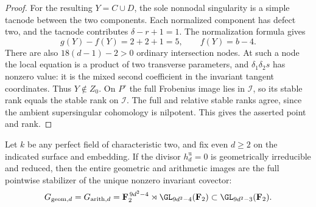 \begin{proof}
For the resulting $Y=C\cup D$, the sole nonnodal singularity
is a simple tacnode between the two components.
Each normalized component has defect two, and the tacnode
contributes $\delta-r+1=1$. The normalization formula gives
\[
                 g(Y)-f(Y)=2+2+1=5,
 \qquad f(Y)=b-4.
\]
There are also $18(d-1)-2>0$ ordinary intersection nodes.
At such a node the local equation is a product of two transverse
parameters, and $\delta_1\delta_2s$ has nonzero value: it is the
mixed second coefficient in the invariant tangent coordinates.
Thus $Y\notin Z_0$. On $P^\circ$ the full Frobenius image lies
in $\mathcal I$, so its stable rank equals the stable rank on
$\mathcal I$. The full and relative stable ranks agree, since
the ambient supersingular cohomology is nilpotent. This gives
the asserted point and rank.
\end{proof}

\begin{theorem}
\label{thm:ss-even-full-group-if-unit-Hasse-irreducible}
Let $k$ be any perfect field of characteristic two, and fix even
$d\ge2$ on the indicated surface and embedding. If the divisor
$h_d^{\mathrm u}=0$ is
geometrically irreducible and reduced, then the entire geometric
and arithmetic images are the full pointwise stabilizer of the
unique nonzero invariant covector:
\[
 G_{\mathrm{geom},d}=G_{\mathrm{arith},d}
   =\mathbf F_2^{\,9d^2-4}\rtimes\GL_{9d^2-4}(\mathbf F_2)
       \subset\GL_{9d^2-3}(\mathbf F_2).
\]
\end{theorem}

